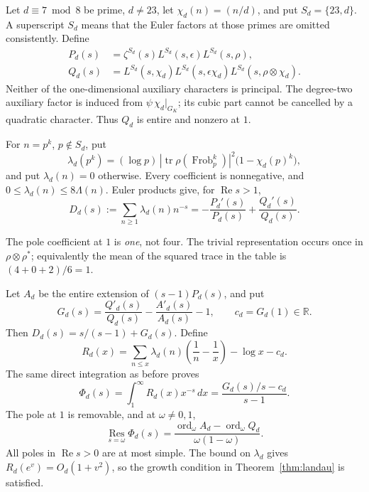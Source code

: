 \documentclass[11pt,letterpaper]{article}
\theoremstyle{definition}
\theoremstyle{remark}
\newcommand{\R}{\mathbb R}
\newcommand{\Rea}{\operatorname{Re}}
\newcommand{\ord}{\operatorname{ord}}
\newcommand{\tr}{\operatorname{tr}}
\begin{document}
Let \(d\equiv7\bmod8\) be prime, \(d\ne23\), let
\(\chi_d(n)=(n/d)\), and put \(S_d=\{23,d\}\).
A superscript \(S_d\) means that the Euler factors at those primes
are omitted consistently. Define
\begin{align*}
 P_d(s)&=\zeta^{S_d}(s)L^{S_d}(s,\epsilon)L^{S_d}(s,\rho),\\
 Q_d(s)&=L^{S_d}(s,\chi_d)L^{S_d}(s,\epsilon\chi_d)
          L^{S_d}(s,\rho\otimes\chi_d).
\end{align*}
Neither of the one-dimensional auxiliary characters is principal.
The degree-two auxiliary factor is induced from
\(\psi\,\chi_d|_{G_K}\); its cubic part cannot be cancelled by a
quadratic character. Thus \(Q_d\) is entire and nonzero at \(1\).

For \(n=p^k\), \(p\notin S_d\), put
\begin{equation}\label{eq:s3lambda}
 \lambda_d(p^k)=
 (\log p)\,|\tr\rho(\operatorname{Frob}_p^k)|^2
           \bigl(1-\chi_d(p)^k\bigr),
\end{equation}
and put \(\lambda_d(n)=0\) otherwise. Every coefficient is
nonnegative, and \(0\le\lambda_d(n)\le8\Lambda(n)\).
Euler products give, for \(\Rea s>1\),
\[
 D_d(s):=\sum_{n\ge1}\lambda_d(n)n^{-s}
       =-\frac{P_d'(s)}{P_d(s)}+\frac{Q_d'(s)}{Q_d(s)}.
\]

The pole coefficient at \(1\) is \emph{one}, not four.
The trivial representation occurs once in
\(\rho\otimes\rho^*\); equivalently the mean of the squared trace
in the table is \((4+0+2)/6=1\).

Let \(A_d\) be the entire extension of \((s-1)P_d(s)\), and put
\[
 G_d(s)=\frac{Q'_d(s)}{Q_d(s)}
        -\frac{A'_d(s)}{A_d(s)}-1,\qquad c_d=G_d(1)\in\R.
\]
Then \(D_d(s)=s/(s-1)+G_d(s)\). Define
\begin{equation}\label{eq:s3remainder}
 R_d(x)=\sum_{n\le x}\lambda_d(n)\left(\frac1n-\frac1x\right)
        -\log x-c_d.
\end{equation}
The same direct integration as before proves
\[
 \Phi_d(s)=\int_1^\infty R_d(x)x^{-s}\,dx
          =\frac{G_d(s)/s-c_d}{s-1}.
\]
The pole at \(1\) is removable, and at \(\omega\ne0,1\),
\begin{equation}\label{eq:s3residue}
 \operatorname*{Res}_{s=\omega}\Phi_d(s)
  =\frac{\ord_\omega A_d-\ord_\omega Q_d}{\omega(1-\omega)}.
\end{equation}
All poles in \(\Rea s>0\) are at most simple. The bound on
\(\lambda_d\) gives \(R_d(e^v)=O_d(1+v^2)\), so the growth
condition in Theorem~\ref{thm:landau} is satisfied.
\end{document}
